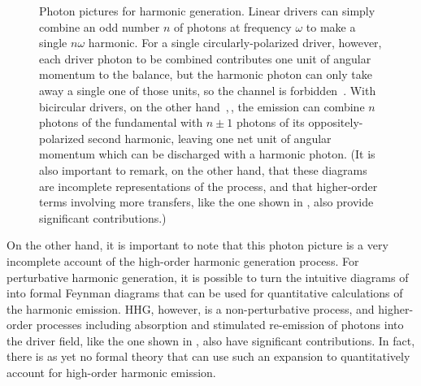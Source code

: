 \begin{figure}[b!]
  \centering
  \subfigure[]{
    
    \label{f8-initial-photon-diagrams-a}
  }
  \hspace{5mm}
  \subfigure[]{
    
    \label{f8-initial-photon-diagrams-b}
  }
  \hspace{5mm}
  \subfigure[]{
    
    \label{f8-initial-photon-diagrams-c}
  }
  \hspace{5mm}
  \subfigure[]{
    
    \label{f8-initial-photon-diagrams-d}
  }
  \hspace{5mm}
  \subfigure[]{
    
    \label{f8-initial-photon-diagrams-e}
  }
  
  \caption[
  Photon pictures for harmonic generation in linear, circular and bicircular fields
  ]{
  Photon pictures for harmonic generation. Linear drivers \protect{} can simply combine an odd number $n$ of photons at frequency $\omega$ to make a single $n\omega$ harmonic. For a single circularly-polarized driver, however, each driver photon to be combined contributes one unit of angular momentum to the balance, but the harmonic photon can only take away a single one of those units, so the channel is forbidden~\protect{}. With bicircular drivers, on the other hand~\protect{},\,\protect{}, the emission can combine $n$ photons of the fundamental with $n\pm1$ photons of its oppositely-polarized second harmonic, leaving one net unit of angular momentum which can be discharged with a harmonic photon. (It is also important to remark, on the other hand, that these diagrams are incomplete representations of the process, and that higher-order terms involving more transfers, like the one shown in \protect{}, also provide significant contributions.)
  }
\label{f8-initial-photon-diagrams}
\end{figure}




On the other hand, it is important to note that this photon picture is a very incomplete account of the high-order harmonic generation process. For perturbative harmonic generation, it is possible to turn the intuitive diagrams of  into formal Feynman diagrams that can be used for quantitative calculations of the harmonic emission. HHG, however, is a non-perturbative process, and higher-order processes including absorption and stimulated re-emission of photons into the driver field, like the one shown in , also have significant contributions. In fact, there is as yet no formal theory that can use such an expansion to quantitatively account for high-order harmonic emission.

